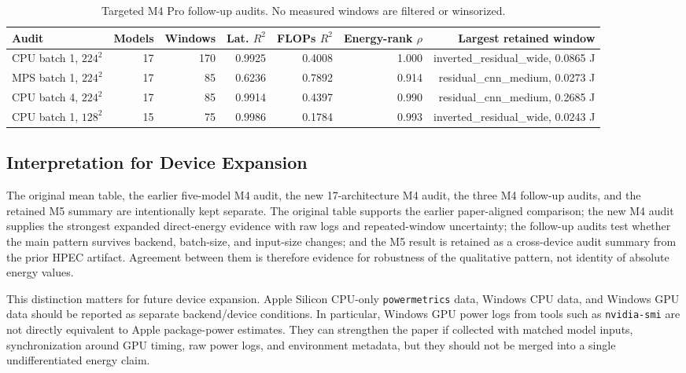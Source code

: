 \documentclass[conference]{IEEEtran}
\begin{document}
\begin{table}[t]
\centering
\caption{Targeted M4 Pro follow-up audits. No measured windows are filtered or winsorized.}
\label{tab:sensitivity}
\begin{tabular}{lrrrrrr}
\toprule
Audit & Models & Windows & Lat. $R^2$ & FLOPs $R^2$ & Energy-rank $\rho$ & Largest retained window \\
\midrule
CPU batch 1, $224^2$ & 17 & 170 & 0.9925 & 0.4008 & 1.000 & inverted\_residual\_wide, 0.0865 J \\
MPS batch 1, $224^2$ & 17 & 85 & 0.6236 & 0.7892 & 0.914 & residual\_cnn\_medium, 0.0273 J \\
CPU batch 4, $224^2$ & 17 & 85 & 0.9914 & 0.4397 & 0.990 & residual\_cnn\_medium, 0.2685 J \\
CPU batch 1, $128^2$ & 15 & 75 & 0.9986 & 0.1784 & 0.993 & inverted\_residual\_wide, 0.0243 J \\
\bottomrule
\end{tabular}
\end{table}

\subsection{Interpretation for Device Expansion}

The original mean table, the earlier five-model M4 audit, the new
17-architecture M4 audit, the three M4 follow-up audits, and the retained M5
summary are intentionally kept
separate. The original table supports the earlier paper-aligned comparison;
the new M4 audit supplies the strongest expanded direct-energy evidence with
raw logs and repeated-window uncertainty; the follow-up audits test whether
the main pattern survives backend, batch-size, and input-size changes; and the
M5 result is retained as a cross-device audit summary from the prior HPEC
artifact. Agreement between
them is therefore evidence for robustness of the qualitative pattern, not
identity of absolute energy values.

This distinction matters for future device expansion. Apple Silicon CPU-only
\texttt{powermetrics} data, Windows CPU data, and Windows GPU data should be
reported as separate backend/device conditions. In particular, Windows GPU
power logs from tools such as \texttt{nvidia-smi} are not directly equivalent
to Apple package-power estimates. They can strengthen the paper if collected
with matched model inputs, synchronization around GPU timing, raw power logs,
and environment metadata, but they should not be merged into a single
undifferentiated energy claim.
\end{document}
